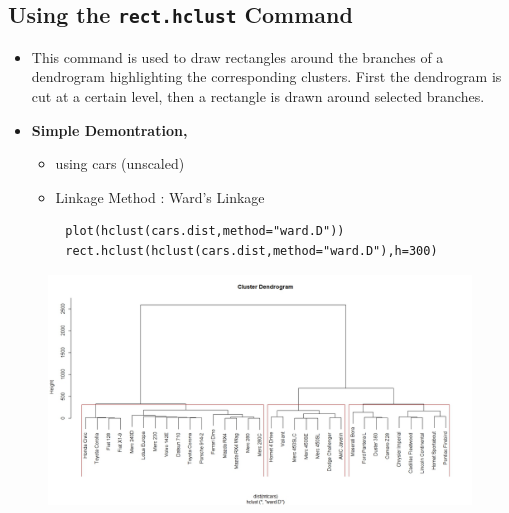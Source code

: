 \documentclass[12pt]{article}
\begin{document}
\subsection{Using the \texttt{rect.hclust} Command}

\begin{itemize}
	\item  This command is used to draw rectangles around the branches of a dendrogram highlighting the corresponding clusters. First the dendrogram is cut at a certain level, then a rectangle is drawn around selected branches.
	\item \textbf{Simple Demontration,}
	\begin{itemize}
		\item using cars (unscaled)
		\item Linkage Method : Ward's Linkage
	\end{itemize}
\end{itemize}

{
	\Large
	\begin{framed}
		\begin{verbatim}
		plot(hclust(cars.dist,method="ward.D"))
		rect.hclust(hclust(cars.dist,method="ward.D"),h=300)                                            
		\end{verbatim}
	\end{framed}
}
\newpage
\begin{figure}[h!]
	\centering
	\includegraphics[width=1.09\linewidth]{./rectclust1}
\end{figure}







\newpage
\end{document}
